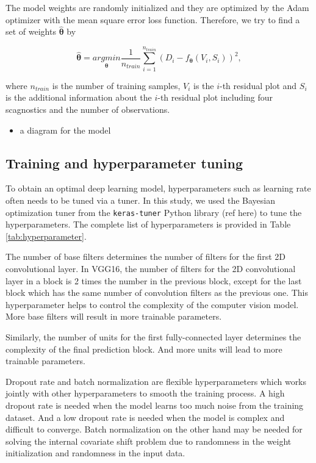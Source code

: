\documentclass[]{interact}
\theoremstyle{plain}%
\theoremstyle{definition}
\theoremstyle{remark}
\providecommand{\tightlist}{%
  \setlength{\itemsep}{0pt}\setlength{\parskip}{0pt}}
\def\tightlist{}
\begin{document}
The model weights are randomly initialized and they are optimized by the
Adam optimizer with the mean square error loss function. Therefore, we
try to find a set of weights \(\hat{\boldsymbol{\theta}}\) by

\[\hat{\boldsymbol{\theta}} = \underset{\boldsymbol{\theta}}{argmin}\frac{1}{n_{train}}\sum_{i=1}^{n_{train}}(D_i - f_{\boldsymbol{\theta}}(V_i, S_i))^2,\]

\noindent where \(n_{train}\) is the number of training samples, \(V_i\)
is the \(i\)-th residual plot and \(S_i\) is the additional information
about the \(i\)-th residual plot including four scagnostics and the
number of observations.

\begin{itemize}
\tightlist
\item
  a diagram for the model
\end{itemize}

\hypertarget{training-and-hyperparameter-tuning}{%
\subsection{Training and hyperparameter
tuning}\label{training-and-hyperparameter-tuning}}

To obtain an optimal deep learning model, hyperparameters such as
learning rate often needs to be tuned via a tuner. In this study, we
used the Bayesian optimization tuner from the \texttt{keras-tuner}
Python library (ref here) to tune the hyperparameters. The complete list
of hyperparameters is provided in Table \ref{tab:hyperparameter}.

The number of base filters determines the number of filters for the
first 2D convolutional layer. In VGG16, the number of filters for the 2D
convolutional layer in a block is 2 times the number in the previous
block, except for the last block which has the same number of
convolution filters as the previous one. This hyperparameter helps to
control the complexity of the computer vision model. More base filters
will result in more trainable parameters.

Similarly, the number of units for the first fully-connected layer
determines the complexity of the final prediction block. And more units
will lead to more trainable parameters.

Dropout rate and batch normalization are flexible hyperparameters which
works jointly with other hyperparameters to smooth the training process.
A high dropout rate is needed when the model learns too much noise from
the training dataset. And a low dropout rate is needed when the model is
complex and difficult to converge. Batch normalization on the other hand
may be needed for solving the internal covariate shift problem due to
randomness in the weight initialization and randomness in the input
data.
\end{document}

